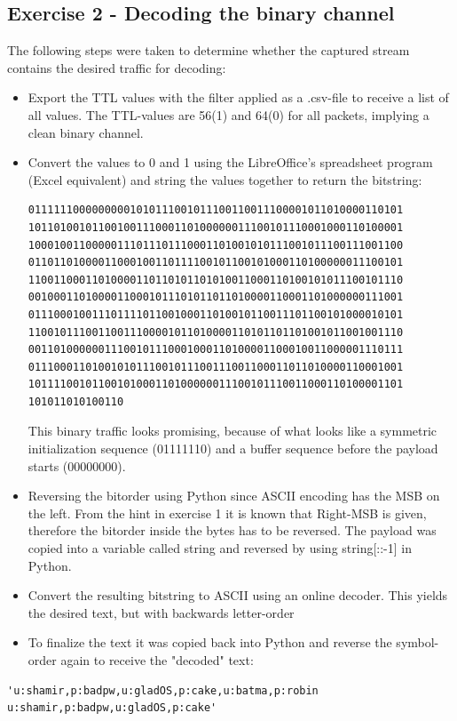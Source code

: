 \documentclass{article}
\begin{document}
\subsection*{Exercise 2 - Decoding the binary channel}
The following steps were taken to determine whether the captured stream contains the desired traffic for decoding:
\begin{itemize}
\item Export the TTL values with the filter applied as a .csv-file to receive a list of all values. The TTL-values are 56(1) and 64(0) for all packets, implying a clean binary channel.
\item Convert the values to 0 and 1 using the LibreOffice's spreadsheet program (Excel equivalent) and string the values together to return the bitstring: 
\begin{verbatim}
01111110000000001010111001011100110011100001011010000110101
10110100101100100111000110100000011100101110001000110100001
10001001100000111011101110001101001010111001011100111001100
01101101000011000100110111100101100101000110100000011100101
11001100011010000110110101101010011000110100101011100101110
00100011010000110001011101011011010000110001101000000111001
01110001001110111101100100011010010110011101100101000010101
11001011100110011100001011010000110101101101001011001001110
00110100000011100101110001000110100001100010011000001110111
01110001101001010111001011100111001100011011010000110001001
10111100101100101000110100000011100101110011000110100001101
101011010100110
\end{verbatim}
This binary traffic looks promising, because of what looks like a symmetric initialization sequence (01111110) and a buffer sequence before the payload starts (00000000).

\item Reversing the bitorder using Python since ASCII encoding has the MSB on the left. From the hint in exercise 1 it is known that Right-MSB is given, therefore the bitorder inside the bytes has to be reversed. The payload was copied into a variable called string and reversed by using string[::-1] in Python.
\item Convert the resulting bitstring to ASCII using an online decoder. This yields the desired text, but with backwards letter-order
\item To finalize the text it was copied back into Python and reverse the symbol-order again to receive the "decoded" text:
\end{itemize}

\begin{verbatim}
'u:shamir,p:badpw,u:gladOS,p:cake,u:batma,p:robin u:shamir,p:badpw,u:gladOS,p:cake'
\end{verbatim}
\end{document}
